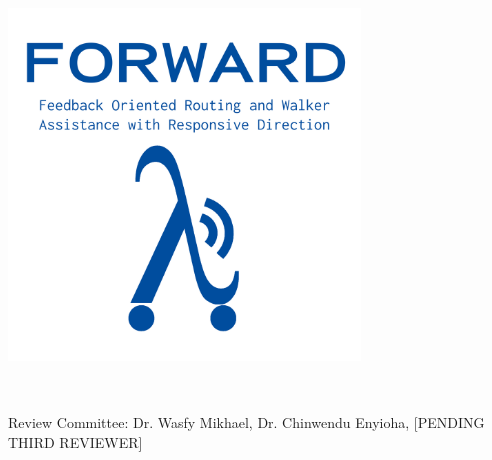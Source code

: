 
\begin{titlepage}
	
	\maketitle
	\thispagestyle{empty}
	\begin{center}
		\includegraphics[width=0.7\textwidth]{./Images/FORWARD_logo_type_blue.png}
	\end{center}

	\hfill \break \\[\baselineskip]

	\begin{center}
		Review Committee: Dr. Wasfy Mikhael, Dr. Chinwendu Enyioha, [PENDING THIRD REVIEWER]
	\end{center}
	
	\centering
	\hfill \break \\[2\baselineskip]
	
	\fancyhf
	
\end{titlepage}